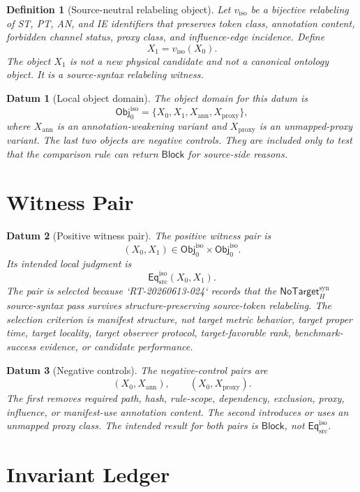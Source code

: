 \documentclass[11pt]{article}
\newcommand{\Obj}{\mathsf{Obj}_{0}^{\mathrm{iso}}}
\newcommand{\EqIso}{\mathsf{Eq}_{\mathrm{src}}^{\mathrm{iso}}}
\newcommand{\NoTargetSyn}{\mathsf{NoTarget}_{H}^{\mathrm{syn}}}
\newcommand{\Block}{\mathsf{Block}}
\newtheorem{definitionblock}{Definition}
\newtheorem{datum}{Datum}
\begin{document}
\begin{definitionblock}[Source-neutral relabeling object]
Let \(v_{\mathrm{iso}}\) be a bijective relabeling of ST, PT, AN, and IE
identifiers that preserves token class, annotation content, forbidden
channel status, proxy class, and influence-edge incidence. Define
\[
    X_{1}=v_{\mathrm{iso}}(X_{0}).
\]
The object \(X_{1}\) is not a new physical candidate and not a canonical
ontology object. It is a source-syntax relabeling witness.
\end{definitionblock}

\begin{datum}[Local object domain]
The object domain for this datum is
\[
    \Obj=\{X_{0},X_{1},X_{\mathrm{ann}},X_{\mathrm{proxy}}\},
\]
where \(X_{\mathrm{ann}}\) is an annotation-weakening variant and
\(X_{\mathrm{proxy}}\) is an unmapped-proxy variant. The last two objects
are negative controls. They are included only to test that the comparison
rule can return \(\Block\) for source-side reasons.
\end{datum}

\section{Witness Pair}

\begin{datum}[Positive witness pair]
The positive witness pair is
\[
    (X_{0},X_{1})\in \Obj\times\Obj.
\]
Its intended local judgment is
\[
    \EqIso(X_{0},X_{1}).
\]
The pair is selected because `RT-20260613-024` records that the
\(\NoTargetSyn\) source-syntax pass survives structure-preserving
source-token relabeling. The selection criterion is manifest structure,
not target metric behavior, target proper time, target locality, target
observer protocol, target-favorable rank, benchmark-success evidence, or
candidate performance.
\end{datum}

\begin{datum}[Negative controls]
The negative-control pairs are
\[
    (X_{0},X_{\mathrm{ann}}),\qquad
    (X_{0},X_{\mathrm{proxy}}).
\]
The first removes required path, hash, rule-scope, dependency, exclusion,
proxy, influence, or manifest-use annotation content. The second introduces
or uses an unmapped proxy class. The intended result for both pairs is
\(\Block\), not \(\EqIso\).
\end{datum}

\section{Invariant Ledger}
\end{document}
